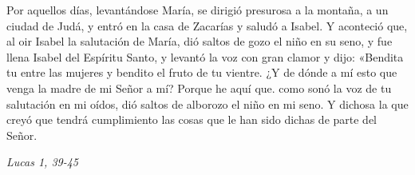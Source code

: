 \documentclass[../../devocionario.tex]{subfiles}
\begin{document}
    Por aquellos días, levantándose María, se dirigió presurosa a la montaña, a un ciudad de Judá, y entró en la casa de Zacarías y saludó a Isabel. 
    Y aconteció que, al oir Isabel la salutación de María, dió saltos de gozo el niño en su seno, y fue llena Isabel del Espíritu Santo, 
    y levantó la voz con gran clamor y dijo: «Bendita tu entre las mujeres y bendito el fruto de tu vientre. ¿Y de dónde a mí esto que venga la madre de mi Señor a mí? 
    Porque he aquí que. como sonó la voz de tu salutación en mi oídos, dió saltos de alborozo el niño en mi seno. 
    Y dichosa la que creyó que tendrá cumplimiento las cosas que le han sido dichas de parte del Señor.
    
    \begin{flushright}
        \textit{Lucas 1, 39-45}
    \end{flushright}
\end{document}
